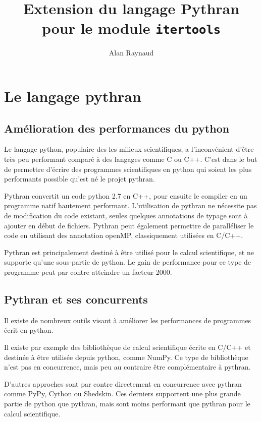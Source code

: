 \documentclass[a4paper]{article}
\title{Extension du langage Pythran pour le module \texttt{itertools}}
\author{Alan Raynaud}
\date{}
\begin{document}

\maketitle   


\clearpage

\section*{Le langage pythran}

\subsection*{Amélioration des performances du python}

Le langage python, populaire des les milieux scientifiques, a
l'inconvénient d'être très peu performant comparé à des langages comme
C ou C++. C'est dans le but de permettre d'écrire des programmes
scientifiques en python qui soient les plus performants possible
qu'est né le projet pythran.

Pythran convertit un code python 2.7 en C++, pour ensuite le compiler
en un programme natif hautement performant. L'utilisation de pythran
ne nécessite pas de modification du code existant, seules quelques
annotations de typage sont à ajouter en début de fichiers. Pythran
peut également permettre de paralléliser le code en utilisant des
annotation openMP, classiquement utilisées en C/C++.

Pythran est principalement destiné à être utilisé pour le calcul
scientifique, et ne supporte qu'une sous-partie de python. Le gain de
performance pour ce type de programme peut par contre atteindre un
facteur 2000.

\subsection*{Pythran et ses concurrents}

Il existe de nombreux outils visant à améliorer les performances de
programmes écrit en python.

Il existe par exemple des bibliothèque de calcul scientifique écrite
en C/C++ et destinée à être utilisée depuis python, comme NumPy. Ce
type de bibliothèque n'est pas en concurrence, mais peu au contraire
être complémentaire à pythran.

D'autres approches sont par contre directement en concurrence avec
pythran comme PyPy, Cython ou Shedskin. Ces derniers supportent une
plus grande partie de python que pythran, mais sont moins performant
que pythran pour le calcul scientifique.
\end{document}
